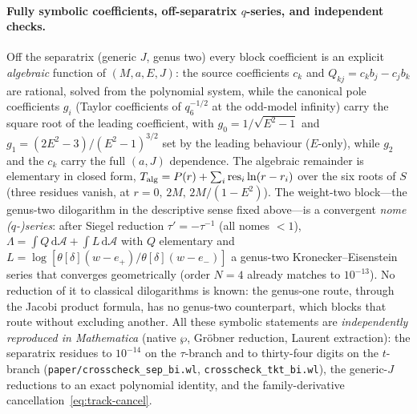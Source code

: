\documentclass[12pt]{iopart}
\theoremstyle{plain}
\theoremstyle{definition}
\theoremstyle{remark}
\newcommand{\dd}{\mathrm{d}}
\begin{document}
\paragraph{Fully symbolic coefficients, off-separatrix $q$-series, and independent checks.}
Off the separatrix (generic $J$, genus two) every block coefficient is an explicit
\emph{algebraic} function of $(M,a,E,J)$: the source coefficients $c_k$ and
$Q_{kj}=c_kb_j-c_jb_k$ are rational, solved from the polynomial system, while the
canonical pole coefficients $g_i$ (Taylor coefficients of $q_6^{-1/2}$ at the odd-model
infinity) carry the square root of the leading coefficient, with
$g_0=1/\sqrt{E^2-1}$ and $g_1=(2E^2-3)/(E^2-1)^{3/2}$ set by the leading behaviour
($E$-only), while $g_2$ and the $c_k$ carry the full $(a,J)$ dependence. The
algebraic remainder is elementary in closed form,
$T_{\rm alg}=P(r)+\sum_i\mathrm{res}_i\ln(r-r_i)$ over the six roots of $S$
(three residues vanish, at $r=0,\,2M,\,2M/(1-E^2)$). The weight-two block---the
genus-two dilogarithm in the descriptive sense fixed above---is a
convergent \emph{nome ($q$-)series}: after Siegel reduction $\tau'=-\tau^{-1}$ (all
nomes ${<}1$), $\Lambda=\int Q\,\dd\mathcal A+\int L\,\dd\mathcal A$ with $Q$
elementary and $L=\log[\theta[\delta](w-e_+)/\theta[\delta](w-e_-)]$ a genus-two
Kronecker--Eisenstein series that converges geometrically (order $N{=}4$ already
matches to $10^{-13}$). No reduction of it to classical dilogarithms is known:
the genus-one route, through the Jacobi product formula, has no genus-two
counterpart, which blocks that route without excluding another. All these symbolic statements are
\emph{independently reproduced in Mathematica} (native $\wp$, Gröbner reduction,
Laurent extraction): the separatrix residues to $10^{-14}$ on the $\tau$-branch and to thirty-four digits on the $t$-branch (\texttt{paper/crosscheck\_sep\_bi.wl}, \texttt{crosscheck\_tkt\_bi.wl}), the generic-$J$
reductions to an exact polynomial identity, and the family-derivative
cancellation~\eqref{eq:track-cancel}.
\end{document}
